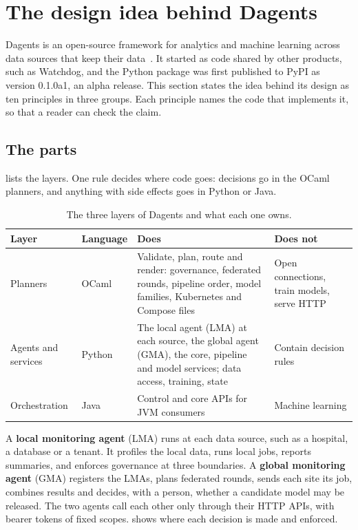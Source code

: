 \section{The design idea behind Dagents}
\label{sec:design}

Dagents is an open-source framework for analytics and machine learning across
data sources that keep their data~\citep{dagents2026repo}. It started as code
shared by other products, such as Watchdog, and the Python package
 was first published to PyPI as version 0.1.0a1, an alpha
release. This section states the idea behind its design as ten principles in
three groups. Each principle names the code that implements it, so that a
reader can check the claim.

\subsection{The parts}

 lists the layers. One rule decides where code goes:
decisions go in the OCaml planners, and anything with side effects goes in
Python or Java.

\begin{table}[h]
\centering
\small
\begin{tabularx}{\linewidth}{@{}l l Y Y@{}}
\toprule
Layer & Language & Does & Does not \\
\midrule
Planners & OCaml & Validate, plan, route and render: governance, federated
  rounds, pipeline order, model families, Kubernetes and Compose files &
  Open connections, train models, serve HTTP \\
Agents and services & Python & The local agent (LMA) at each source, the
  global agent (GMA), the core, pipeline and model services; data access,
  training, state & Contain decision rules \\
Orchestration & Java & Control and core APIs for JVM consumers & Machine
  learning \\
\bottomrule
\end{tabularx}
\caption{The three layers of Dagents and what each one owns.}
\label{tab:layers}
\end{table}

A \textbf{local monitoring agent} (LMA) runs at each data source, such as a
hospital, a database or a tenant. It profiles the local data, runs local jobs,
reports summaries, and enforces governance at three boundaries. A
\textbf{global monitoring agent} (GMA) registers the LMAs, plans federated
rounds, sends each site its job, combines results and decides, with a person,
whether a candidate model may be released. The two agents call each other only
through their HTTP APIs, with bearer tokens of fixed scopes.
 shows where each decision is made and enforced.


